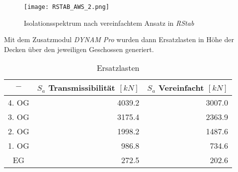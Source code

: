 \begin{figure}[H]
    \centering
    \texttt{[image: RSTAB\_AWS\_2.png]}
    \caption{Isolationsspektrum nach vereinfachtem Ansatz in \emph{RStab}}
\end{figure}

Mit dem Zusatzmodul \emph{DYNAM Pro} wurden dann Ersatzlasten in Höhe der Decken über den jeweiligen Geschossen generiert.

\begin{table}[H]
\centering
\begin{tabular}{ |c|r|r| } 
 \hline
 $-$ & $S_a$ Transmissibilität $[kN]$ & $S_a$ Vereinfacht $[kN]$\\
 \hline\hline
4. OG & 4039.2 & 3007.0\\
3. OG & 3175.4 & 2363.9\\
2. OG & 1998.2 & 1487.6\\
1. OG &  986.8 &  734.6\\
EG    &  272.5 &  202.6\\
 \hline
\end{tabular}
\caption{Ersatzlasten}
\end{table}

\pagebreak